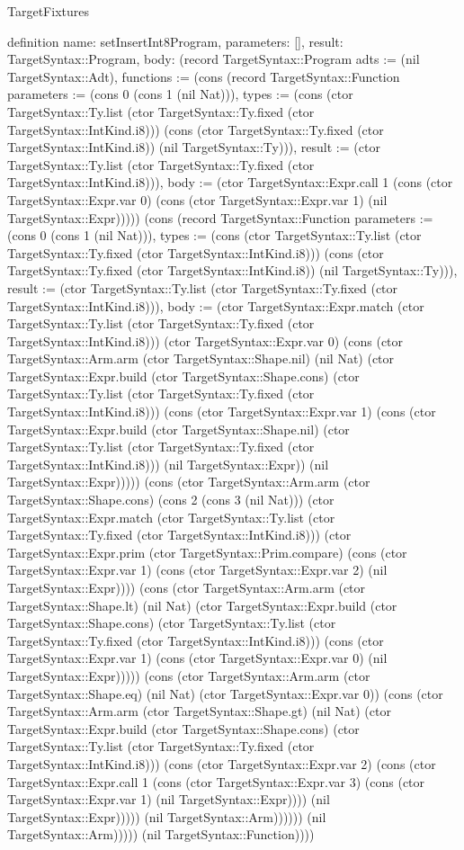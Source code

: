 \begin{lexlean}{TargetFixtures}
\begin{semanticmodule}
definition{
  name: setInsertInt8Program,
  parameters: [],
  result: TargetSyntax::Program,
  body: (record TargetSyntax::Program {adts := (nil TargetSyntax::Adt), functions := (cons (record TargetSyntax::Function {parameters := (cons 0 (cons 1 (nil Nat))), types := (cons (ctor TargetSyntax::Ty.list (ctor TargetSyntax::Ty.fixed (ctor TargetSyntax::IntKind.i8))) (cons (ctor TargetSyntax::Ty.fixed (ctor TargetSyntax::IntKind.i8)) (nil TargetSyntax::Ty))), result := (ctor TargetSyntax::Ty.list (ctor TargetSyntax::Ty.fixed (ctor TargetSyntax::IntKind.i8))), body := (ctor TargetSyntax::Expr.call 1 (cons (ctor TargetSyntax::Expr.var 0) (cons (ctor TargetSyntax::Expr.var 1) (nil TargetSyntax::Expr))))}) (cons (record TargetSyntax::Function {parameters := (cons 0 (cons 1 (nil Nat))), types := (cons (ctor TargetSyntax::Ty.list (ctor TargetSyntax::Ty.fixed (ctor TargetSyntax::IntKind.i8))) (cons (ctor TargetSyntax::Ty.fixed (ctor TargetSyntax::IntKind.i8)) (nil TargetSyntax::Ty))), result := (ctor TargetSyntax::Ty.list (ctor TargetSyntax::Ty.fixed (ctor TargetSyntax::IntKind.i8))), body := (ctor TargetSyntax::Expr.match (ctor TargetSyntax::Ty.list (ctor TargetSyntax::Ty.fixed (ctor TargetSyntax::IntKind.i8))) (ctor TargetSyntax::Expr.var 0) (cons (ctor TargetSyntax::Arm.arm (ctor TargetSyntax::Shape.nil) (nil Nat) (ctor TargetSyntax::Expr.build (ctor TargetSyntax::Shape.cons) (ctor TargetSyntax::Ty.list (ctor TargetSyntax::Ty.fixed (ctor TargetSyntax::IntKind.i8))) (cons (ctor TargetSyntax::Expr.var 1) (cons (ctor TargetSyntax::Expr.build (ctor TargetSyntax::Shape.nil) (ctor TargetSyntax::Ty.list (ctor TargetSyntax::Ty.fixed (ctor TargetSyntax::IntKind.i8))) (nil TargetSyntax::Expr)) (nil TargetSyntax::Expr))))) (cons (ctor TargetSyntax::Arm.arm (ctor TargetSyntax::Shape.cons) (cons 2 (cons 3 (nil Nat))) (ctor TargetSyntax::Expr.match (ctor TargetSyntax::Ty.list (ctor TargetSyntax::Ty.fixed (ctor TargetSyntax::IntKind.i8))) (ctor TargetSyntax::Expr.prim (ctor TargetSyntax::Prim.compare) (cons (ctor TargetSyntax::Expr.var 1) (cons (ctor TargetSyntax::Expr.var 2) (nil TargetSyntax::Expr)))) (cons (ctor TargetSyntax::Arm.arm (ctor TargetSyntax::Shape.lt) (nil Nat) (ctor TargetSyntax::Expr.build (ctor TargetSyntax::Shape.cons) (ctor TargetSyntax::Ty.list (ctor TargetSyntax::Ty.fixed (ctor TargetSyntax::IntKind.i8))) (cons (ctor TargetSyntax::Expr.var 1) (cons (ctor TargetSyntax::Expr.var 0) (nil TargetSyntax::Expr))))) (cons (ctor TargetSyntax::Arm.arm (ctor TargetSyntax::Shape.eq) (nil Nat) (ctor TargetSyntax::Expr.var 0)) (cons (ctor TargetSyntax::Arm.arm (ctor TargetSyntax::Shape.gt) (nil Nat) (ctor TargetSyntax::Expr.build (ctor TargetSyntax::Shape.cons) (ctor TargetSyntax::Ty.list (ctor TargetSyntax::Ty.fixed (ctor TargetSyntax::IntKind.i8))) (cons (ctor TargetSyntax::Expr.var 2) (cons (ctor TargetSyntax::Expr.call 1 (cons (ctor TargetSyntax::Expr.var 3) (cons (ctor TargetSyntax::Expr.var 1) (nil TargetSyntax::Expr)))) (nil TargetSyntax::Expr))))) (nil TargetSyntax::Arm)))))) (nil TargetSyntax::Arm))))}) (nil TargetSyntax::Function)))})
}


\end{semanticmodule}
\end{lexlean}
